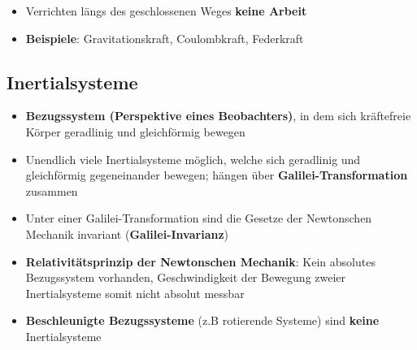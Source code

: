 \begin{itemize}
	\item Verrichten längs des geschlossenen Weges \textbf{keine Arbeit}
	\item \textbf{Beispiele}: Gravitationskraft, Coulombkraft, Federkraft
\end{itemize}

\subsection{Inertialsysteme}%
\label{newt:sub:inertialsysteme}

\begin{itemize}
	\item \textbf{Bezugssystem (Perspektive eines Beobachters)}, in dem sich kräftefreie Körper geradlinig und gleichförmig bewegen
	\item Unendlich viele Inertialsysteme möglich, welche sich geradlinig und gleichförmig gegeneinander bewegen; hängen über \textbf{Galilei-Transformation} zusammen
	\item Unter einer Galilei-Transformation sind die Gesetze der Newtonschen Mechanik invariant (\textbf{Galilei-Invarianz})
	\item \textbf{Relativitätsprinzip der Newtonschen Mechanik}: Kein absolutes Bezugssystem vorhanden, Geschwindigkeit der Bewegung zweier Inertialsysteme somit nicht absolut messbar
	\item \textbf{Beschleunigte Bezugssysteme} (z.B rotierende Systeme) sind \textbf{keine} Inertialsysteme
\end{itemize}